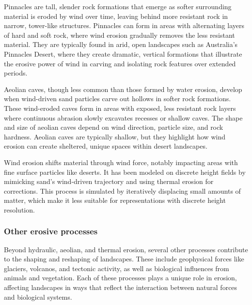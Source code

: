 Pinnacles are tall, slender rock formations that emerge as softer surrounding material is eroded by wind over time, leaving behind more resistant rock in narrow, tower-like structures. Pinnacles can form in areas with alternating layers of hard and soft rock, where wind erosion gradually removes the less resistant material. They are typically found in arid, open landscapes such as Australia’s Pinnacles Desert, where they create dramatic, vertical formations that illustrate the erosive power of wind in carving and isolating rock features over extended periods.

Aeolian caves, though less common than those formed by water erosion, develop when wind-driven sand particles carve out hollows in softer rock formations. These wind-eroded caves form in areas with exposed, less resistant rock layers where continuous abrasion slowly excavates recesses or shallow caves. The shape and size of aeolian caves depend on wind direction, particle size, and rock hardness. Aeolian caves are typically shallow, but they highlight how wind erosion can create sheltered, unique spaces within desert landscapes.

Wind erosion shifts material through wind force, notably impacting areas with fine surface particles like deserts. It has been modeled on discrete height fields \cite{Roa2004, Paris2020} by mimicking sand's wind-driven trajectory and using thermal erosion for corrections. This process is simulated by iteratively displacing small amounts of matter, which make it less suitable for representations with discrete height resolution.


\subsubsection{Other erosive processes}
Beyond hydraulic, aeolian, and thermal erosion, several other processes contribute to the shaping and reshaping of landscapes. These include geophysical forces like glaciers, volcanos, and tectonic activity, as well as biological influences from animals and vegetation. Each of these processes plays a unique role in erosion, affecting landscapes in ways that reflect the interaction between natural forces and biological systems.

